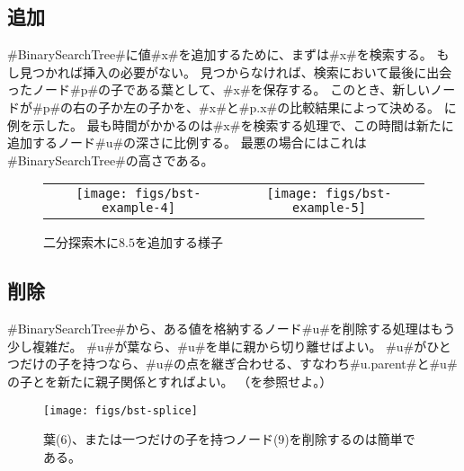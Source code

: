\subsection{追加}

#BinarySearchTree#に値#x#を追加するために、まずは#x#を検索する。
もし見つかれば挿入の必要がない。
見つからなければ、検索において最後に出会ったノード#p#の子である葉として、#x#を保存する。
このとき、新しいノードが#p#の右の子か左の子かを、#x#と#p.x#の比較結果によって決める。
に例を示した。
最も時間がかかるのは#x#を検索する処理で、この時間は新たに追加するノード#u#の深さに比例する。 %
最悪の場合にはこれは#BinarySearchTree#の高さである。

\begin{figure}
  \begin{center}
    \begin{tabular}{cc}
    \texttt{[image: figs/bst-example-4]} &
    \texttt{[image: figs/bst-example-5]}
    \end{tabular}
  \end{center}
  \caption{二分探索木に$8.5$を追加する様子}
\end{figure}


\subsection{削除}

#BinarySearchTree#から、ある値を格納するノード#u#を削除する処理はもう少し複雑だ。
#u#が葉なら、#u#を単に親から切り離せばよい。
#u#がひとつだけの子を持つなら、#u#の点を継ぎ合わせる、すなわち#u.parent#と#u#の子とを新たに親子関係とすればよい。
（を参照せよ。）

\begin{figure}
  \begin{center}
    \texttt{[image: figs/bst-splice]}
  \end{center}
  \caption{葉($6$)、または一つだけの子を持つノード($9$)を削除するのは簡単である。}
\end{figure}

